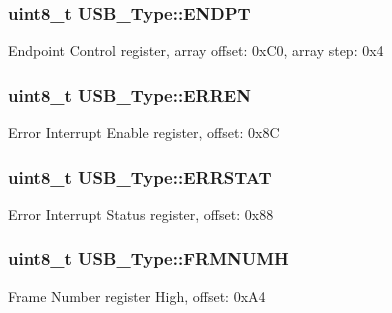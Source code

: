 \subsubsection[{\texorpdfstring{E\+N\+D\+PT}{ENDPT}}]{ uint8\+\_\+t U\+S\+B\+\_\+\+Type\+::\+E\+N\+D\+PT}\hypertarget{structUSB__Type_ae31e5076afa4cee3a94c6b57b374426a}{}\label{structUSB__Type_ae31e5076afa4cee3a94c6b57b374426a}
Endpoint Control register, array offset\+: 0x\+C0, array step\+: 0x4 
\subsubsection[{\texorpdfstring{E\+R\+R\+EN}{ERREN}}]{ uint8\+\_\+t U\+S\+B\+\_\+\+Type\+::\+E\+R\+R\+EN}\hypertarget{structUSB__Type_a29f6538d60be550166683242c93649a7}{}\label{structUSB__Type_a29f6538d60be550166683242c93649a7}
Error Interrupt Enable register, offset\+: 0x8C 
\subsubsection[{\texorpdfstring{E\+R\+R\+S\+T\+AT}{ERRSTAT}}]{ uint8\+\_\+t U\+S\+B\+\_\+\+Type\+::\+E\+R\+R\+S\+T\+AT}\hypertarget{structUSB__Type_af3e1c49392d797dfdc81155e0b37a80b}{}\label{structUSB__Type_af3e1c49392d797dfdc81155e0b37a80b}
Error Interrupt Status register, offset\+: 0x88 
\subsubsection[{\texorpdfstring{F\+R\+M\+N\+U\+MH}{FRMNUMH}}]{ uint8\+\_\+t U\+S\+B\+\_\+\+Type\+::\+F\+R\+M\+N\+U\+MH}\hypertarget{structUSB__Type_a5d81326ef75b015cfa68f73b9c8434bf}{}\label{structUSB__Type_a5d81326ef75b015cfa68f73b9c8434bf}
Frame Number register High, offset\+: 0x\+A4 
